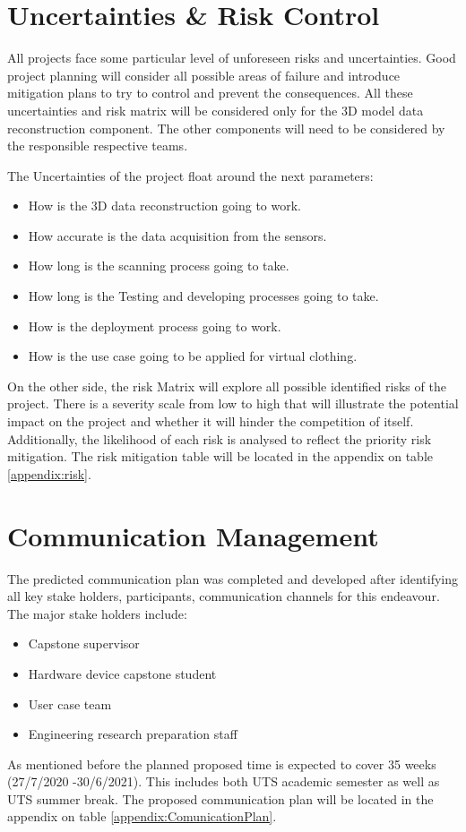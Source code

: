 \documentclass[12pt]{report}
\begin{document}
\section{Uncertainties \& Risk Control}
All projects face some particular level of unforeseen risks and uncertainties. Good project planning will consider all possible areas of failure and introduce mitigation plans to try to control and prevent the consequences.  
All these uncertainties and risk matrix will be considered only for the 3D model data reconstruction component. The other components will need to be considered by the responsible respective teams. 

\newpage
The Uncertainties of the project float around the next parameters:
\begin{itemize}
  \item How is the 3D data reconstruction going to work.
  \item How accurate is the data acquisition from the sensors.
  \item How long is the scanning process going to take. 
  \item How long is the Testing and developing processes going to take. 
  \item How is the deployment process going to work.
  \item How is the use case going to be applied for virtual clothing.
\end{itemize}

On the other side, the risk Matrix will explore all possible identified risks of the project. 
There is a severity scale from low to high that will illustrate the potential impact on the project and whether it will hinder the competition of itself.
 Additionally, the likelihood of each risk is analysed to reflect the priority risk mitigation. 
The risk mitigation table will be located in the appendix on table \ref{appendix:risk}. 

\section{Communication Management}
The predicted communication plan was completed and developed after identifying all key stake holders, participants, communication channels for this endeavour. The major stake holders include:
\begin{itemize}
  \item Capstone supervisor
  \item Hardware device capstone student
  \item User case team
  \item Engineering research preparation staff
\end{itemize}
As mentioned before the planned proposed time is expected to cover 35 weeks (27/7/2020 -30/6/2021). This includes both UTS academic semester as well as UTS summer break. 
The proposed communication plan will be located in the appendix on table \ref{appendix:ComunicationPlan}. 
\end{document}
